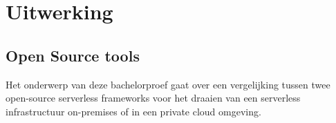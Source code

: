\chapter{Uitwerking}
\label{ch:uitwerking}
\section{Open Source tools}
Het onderwerp van deze bachelorproef gaat over een vergelijking tussen twee open-source serverless frameworks voor het draaien van een serverless infrastructuur on-premises of in een private cloud omgeving.